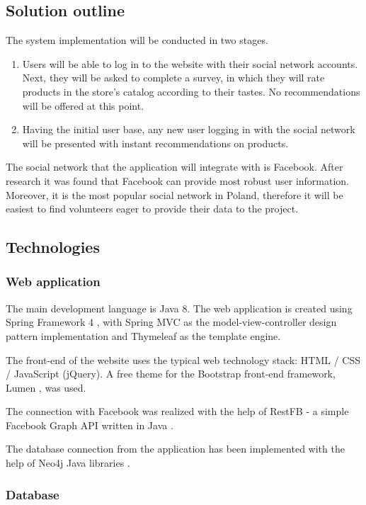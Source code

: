 \documentclass[12pt]{report}
\begin{document}
\subsection{Solution outline}

The system implementation will be conducted in two stages.
\begin{enumerate}
\item Users will be able to log in to the website with their social network accounts. Next, they will be asked to complete a survey, in which they will rate products in the store's catalog according to their tastes. No recommendations will be offered at this point.
\item Having the initial user base, any new user logging in with the social network will be presented with instant recommendations on products.
\end{enumerate}

The social network that the application will integrate with is Facebook. After research it was found that Facebook can provide most robust user information. Moreover, it is the most popular social network in Poland, therefore it will be easiest to find volunteers eager to provide their data to the project.

\subsection{Technologies}
\subsubsection{Web application}
The main development language is Java 8. The web application is created using Spring Framework 4 \cite{spring_framework}, with Spring MVC as the model-view-controller design pattern implementation and Thymeleaf as the template engine. 

The front-end of the website uses the typical web technology stack: HTML / CSS / JavaScript (jQuery). A free theme for the Bootstrap front-end framework, Lumen \cite{lumen}, was used.

The connection with Facebook was realized with the help of RestFB - a simple Facebook Graph API written in Java \cite{restfb}.

The database connection from the application has been implemented with the help of Neo4j Java libraries \cite{neo4j}.

\subsubsection{Database}
\end{document}

